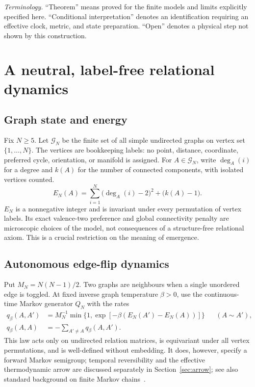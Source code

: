 \documentclass[11pt,a4paper]{article}
\numberwithin{equation}{section}
\newcommand{\G}{\mathcal{G}}
\newcommand{\1}{\mathbf{1}}
\begin{document}
\noindent\textit{Terminology.} ``Theorem'' means proved for the finite models and limits explicitly specified here. ``Conditional interpretation'' denotes an identification requiring an effective clock, metric, and state preparation. ``Open'' denotes a physical step not shown by this construction.

\section{A neutral, label-free relational dynamics}
\subsection{Graph state and energy}
Fix $N\geq5$. Let $\G_N$ be the finite set of all simple undirected graphs on vertex set $\{1,\ldots,N\}$. The vertices are bookkeeping labels: no point, distance, coordinate, preferred cycle, orientation, or manifold is assigned. For $A\in\G_N$, write $\deg_A(i)$ for a degree and $k(A)$ for the number of connected components, with isolated vertices counted.
\begin{equation}\label{eq:energy}
 E_N(A)=\sum_{i=1}^{N}\bigl(\deg_A(i)-2\bigr)^2+\bigl(k(A)-1\bigr).
\end{equation}
$E_N$ is a nonnegative integer and is invariant under every permutation of vertex labels. Its exact valence-two preference and global connectivity penalty are microscopic choices of the model, not consequences of a structure-free relational axiom. This is a crucial restriction on the meaning of emergence.

\subsection{Autonomous edge-flip dynamics}
Put $M_N=N(N-1)/2$. Two graphs are neighbours when a single unordered edge is toggled. At fixed inverse graph temperature $\beta>0$, use the continuous-time Markov generator $Q_N$ with the rates
\begin{align}
 q_\beta(A,A')&=M_N^{-1}\min\bigl\{1,\exp[-\beta(E_N(A')-E_N(A))]\bigr\}
 &&(A\sim A'),\label{eq:rates}\\[-2pt]
 q_\beta(A,A)&=-\sum_{A'\neq A}q_\beta(A,A').\nonumber
\end{align}
This law acts only on undirected relation matrices, is equivariant under all vertex permutations, and is well-defined without embedding. It does, however, specify a forward Markov semigroup; temporal reversibility and the effective thermodynamic arrow are discussed separately in Section~\ref{sec:arrow}; see also standard background on finite Markov chains~\cite{markov}.
\end{document}
